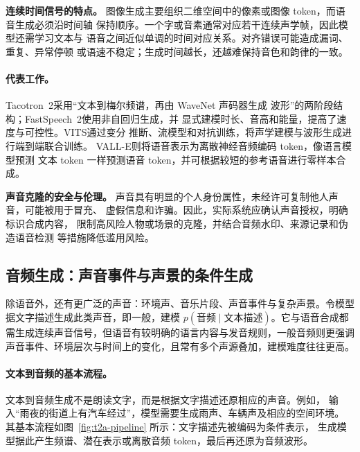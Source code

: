 \noindent\textbf{连续时间信号的特点。}
图像生成主要组织二维空间中的像素或图像 token，而语音生成必须沿时间轴
保持顺序。一个字或音素通常对应若干连续声学帧，因此模型还需学习文本与
语音之间近似单调的时间对应关系。对齐错误可能造成漏词、重复、异常停顿
或语速不稳定；生成时间越长，还越难保持音色和韵律的一致。

\paragraph{代表工作。}
Tacotron~2\cite{tacotron2}采用“文本到梅尔频谱，再由 WaveNet 声码器生成
波形”的两阶段结构；FastSpeech~2\cite{fastspeech2}使用非自回归生成，并
显式建模时长、音高和能量，提高了速度与可控性。VITS\cite{vits}通过变分
推断、流模型和对抗训练，将声学建模与波形生成进行端到端联合训练。
VALL-E\cite{valle}则将语音表示为离散神经音频编码 token，像语言模型预测
文本 token 一样预测语音 token，并可根据较短的参考语音进行零样本合成。

\begin{importantnote}
  \textbf{声音克隆的安全与伦理。}
  声音具有明显的个人身份属性，未经许可复制他人声音，可能被用于冒充、
  虚假信息和诈骗。因此，实际系统应确认声音授权，明确标识合成内容，
  限制高风险人物或场景的克隆，并结合音频水印、来源记录和伪造语音检测
  等措施降低滥用风险\cite{nist-synthetic}。
\end{importantnote}

\subsection{音频生成：声音事件与声景的条件生成}
\label{sub:t2a}

除语音外，还有更广泛的声音：环境声、音乐片段、声音事件与复杂声景。令模型据文字描述生成此类声音，即一般，建模 $p(\text{音频}\mid\text{文本描述})$。它与语音合成都需生成连续声音信号，但语音有较明确的语言内容与发音规则，一般音频则更强调声音事件、环境层次与时间上的变化，且常有多个声源叠加，建模难度往往更高。

\paragraph{文本到音频的基本流程。}
文本到音频生成不是朗读文字，而是根据文字描述还原相应的声音。例如，
输入“雨夜的街道上有汽车经过”，模型需要生成雨声、车辆声及相应的空间环境。
其基本流程如图~\ref{fig:t2a-pipeline} 所示：文字描述先被编码为条件表示，
生成模型据此产生频谱、潜在表示或离散音频 token，最后再还原为音频波形。

